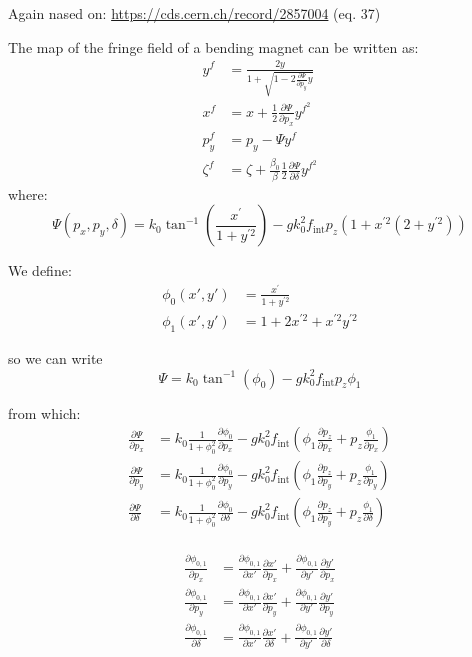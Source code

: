 Again nased on: \url{https://cds.cern.ch/record/2857004} (eq. 37)

The map of the fringe field of a bending magnet can be written as:
\begin{align} 
y^f & =\frac{2 y}{1+\sqrt{1-2 \frac{\partial \Psi}{\partial p_y} y}} \\ 
x^f & =x+\frac{1}{2} \frac{\partial \Psi}{\partial p_x} y^{f^2} \\
p_y^f & =p_y-\Psi y^f \\ 
\zeta^f & =\zeta+\frac{\beta_0}{\beta}\frac{1}{2} \frac{\partial \Psi}{\partial \delta} y^{f^2}
\end{align}
where:
\begin{equation}
\Psi\left(p_x, p_y, \delta\right)=k_0\tan ^{-1}\left(\frac{x^{\prime}}{1+y^{\prime 2}}\right)-g k_0^2 f_\text{int} p_z \left(1+x^{\prime 2}\left(2+y^{\prime 2}\right)\right) 
\end{equation}

We define:
\begin{align}
\phi_0(x', y') &= \frac{x^{\prime}}{1+y^{\prime 2}}\\
\phi_1(x', y') &= 1+2x^{\prime 2}+x^{\prime 2}y^{\prime 2} 
\end{align}

so we can write
\begin{equation}
\Psi=k_0\tan^{-1}\left(\phi_0 \right)
-g k_0^2 f_\text{int} 
p_z \phi_1
\end{equation}

from which:
\begin{align}
\frac{\partial\Psi}{\partial p_x} &= 
k_0 \frac{1}{1 + \phi_0^2}\frac{\partial\phi_0}{\partial p_x}
-gk_0^2 f_\text{int}
\left(\phi_1 \frac{\partial p_z}{\partial p_x}
 + p_z \frac{\phi_1}{\partial p_x}
\right)\\
\frac{\partial\Psi}{\partial p_y} &= 
k_0 \frac{1}{1 + \phi_0^2}\frac{\partial\phi_0}{\partial p_y}
-gk_0^2 f_\text{int}
\left(\phi_1 \frac{\partial p_z}{\partial p_y}
 + p_z \frac{\phi_1}{\partial p_y}
\right)\\
\frac{\partial\Psi}{\partial \delta} &= 
k_0 \frac{1}{1 + \phi_0^2}\frac{\partial\phi_0}{\partial \delta }
-gk_0^2 f_\text{int}
\left(\phi_1 \frac{\partial p_z}{\partial p_y}
 + p_z \frac{\phi_1}{\partial \delta}
\right)\\
\end{align}

\begin{align}
\frac{\partial \phi_{0,1}}{\partial p_x} &= 
\frac{\partial \phi_{0,1}}{\partial x'} \frac{\partial x'}{\partial p_x}
+\frac{\partial \phi_{0,1}}{\partial y'} \frac{\partial y'}{\partial p_x}
\\
\frac{\partial \phi_{0,1}}{\partial p_y} &= 
\frac{\partial \phi_{0,1}}{\partial x'} \frac{\partial x'}{\partial p_y}
+\frac{\partial\phi_{0,1}}{\partial y'} \frac{\partial y'}{\partial p_y}
\\
\frac{\partial \phi_{0,1}}{\partial \delta} &= 
\frac{\partial \phi_{0,1}}{\partial x'} \frac{\partial x'}{\partial \delta}
+\frac{\partial\phi_{0,1}}{\partial y'} \frac{\partial y'}{\partial \delta}
\end{align}


